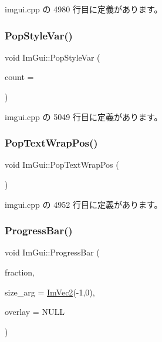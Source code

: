  imgui.\+cpp の 4980 行目に定義があります。

\mbox{\label{namespace_im_gui_a14116e57d81e326adef2a702e65781d4}} 
\subsubsection{\texorpdfstring{Pop\+Style\+Var()}{PopStyleVar()}}
{\footnotesize\ttfamily void Im\+Gui\+::\+Pop\+Style\+Var (\begin{DoxyParamCaption}\item[{int}]{count = {} }\end{DoxyParamCaption})}



 imgui.\+cpp の 5049 行目に定義があります。

\mbox{\label{namespace_im_gui_a08000421b9cc13757430efe54178ae0f}} 
\subsubsection{\texorpdfstring{Pop\+Text\+Wrap\+Pos()}{PopTextWrapPos()}}
{\footnotesize\ttfamily void Im\+Gui\+::\+Pop\+Text\+Wrap\+Pos (\begin{DoxyParamCaption}{ }\end{DoxyParamCaption})}



 imgui.\+cpp の 4952 行目に定義があります。

\mbox{\label{namespace_im_gui_a83349d38c7c73f92ae977bc5b530a9e9}} 
\subsubsection{\texorpdfstring{Progress\+Bar()}{ProgressBar()}}
{\footnotesize\ttfamily void Im\+Gui\+::\+Progress\+Bar (\begin{DoxyParamCaption}\item[{float}]{fraction,  }\item[{const \mbox{\hyperlink{struct_im_vec2}{Im\+Vec2}} \&}]{size\+\_\+arg = {\ttfamily \mbox{\hyperlink{struct_im_vec2}{Im\+Vec2}}(-\/1,0)},  }\item[{const char $\ast$}]{overlay = {\ttfamily NULL} }\end{DoxyParamCaption})}



